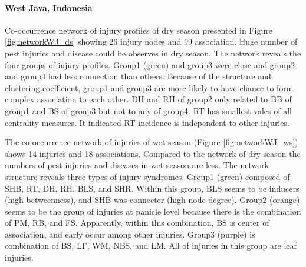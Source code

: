 \paragraph{West Java, Indonesia}

Co-occurrence network of injury profiles of dry season presented in Figure \ref{fig:networkWJ_ds} showing 26 injury nodes and 99 association. Huge number of pest injuries and disease could be observes in dry season.  The network reveals the four groups of injury profiles. Group1 (green) and group3 were close and group2 and group4 had less connection than others. Because of the structure and clustering coefficient, group1 and group3 are more likely to have chance to form complex association to each other. DH and RH of group2 only related to BB of group1 and BS of group3 but not to any of group4. RT has smallest vales of all centrality measures. It indicated RT incidence is independent to other injuries.    

The co-occurrence network of injuries of wet season (Figure \ref{fig:networkWJ_ws}) shows 14 injuries and 18 associations. Compared to the network of dry season the numbers of pest injuries and diseases in wet season are less. The network structure reveals three types of injury syndromes. Group1 (green) composed of SHB, RT, DH, RH, BLS, and SHR.  Within this group, BLS seems to be inducers (high betweenness), and SHB was connecter (high node degree). Group2 (orange) seems to be the group of injuries at panicle level because there is the combination of PM, RB, and FS. Apparently, within this combination, BS is center of association, and early occur among other injuries. Group3 (purple) is combination of BS, LF, WM, NBS, and LM. All of injuries in this group are leaf injuries. 

